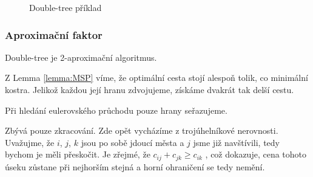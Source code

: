 \documentclass[
  biblatex,
  figures=false,
  glossaries,
  index
]{kidiplom}
\begin{document}
\begin{figure}[H]
\begin{example}
      \hfill
    \end{example}
    \caption{Double-tree příklad}
\end{figure}


\subsubsection{Aproximační faktor}
\begin{theorem}
Double-tree je 2-aproximační algoritmus.
\end{theorem}
	Z Lemma \ref{lemma:MSP} víme, že optimální cesta stojí alespoň tolik, co minimální kostra. Jelikož každou její hranu zdvojujeme, získáme dvakrát tak delší cestu.
	
	Při hledání eulerovského průchodu pouze hrany seřazujeme.
	
	Zbývá pouze zkracování. Zde opět vycházíme z trojúhelníkové nerovnosti. Uvažujme, že $i$, $j$, $k$ jsou po sobě jdoucí města a $j$ jsme již navštívili, tedy bychom je měli přeskočit. Je zřejmé, že $c_{ij} + c_{jk} \ge c_{ik}$ , což dokazuje, cena tohoto úseku zůstane při nejhorším stejná a horní ohraničení se tedy nemění.
	
\end{document}
